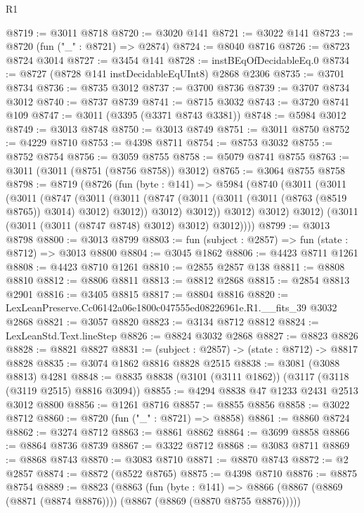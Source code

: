 \begin{lexlean}{R1}
\begin{coremodule}
@8719 := @3011 @8718
@8720 := @3020 @141
@8721 := @3022 @141
@8723 := @8720 (fun ("_" : @8721) => @2874)
@8724 := @8040 @8716
@8726 := @8723 @8724 @3014
@8727 := @3454 @141
@8728 := instBEqOfDecidableEq.{0}
@8734 := @8727 (@8728 @141 instDecidableEqUInt8) @2868 @2306
@8735 := @3701 @8734
@8736 := @8735 @3012
@8737 := @3700 @8736
@8739 := @3707 @8734 @3012
@8740 := @8737 @8739
@8741 := @8715 @3032
@8743 := @3720 @8741 @109
@8747 := @3011 (@3395 (@3371 @8743 @3381))
@8748 := @5984 @3012
@8749 := @3013 @8748
@8750 := @3013 @8749
@8751 := @3011 @8750
@8752 := @4229 @8710
@8753 := @4398 @8711
@8754 := @8753 @3032
@8755 := @8752 @8754
@8756 := @3059 @8755
@8758 := @5079 @8741 @8755
@8763 := @3011 (@3011 (@8751 (@8756 @8758)) @3012)
@8765 := @3064 @8755 @8758
@8798 := @8719
    (@8726
      (fun (byte : @141) =>
      @5984
        (@8740
          (@3011
            (@3011
              (@3011
                (@8747
                  (@3011
                    (@3011
                      (@8747 (@3011 (@3011 (@3011 (@8763 (@8519 @8765)) @3014) @3012) @3012))
                      @3012)
                    @3012))
                @3012)
              @3012)
            @3012)
          (@3011 (@3011 (@3011 (@8747 @8748) @3012) @3012) @3012))))
@8799 := @3013 @8798
@8800 := @3013 @8799
@8803 := fun (subject : @2857) => fun (state : @8712) => @3013 @8800
@8804 := @3045 @1862
@8806 := @4423 @8711 @1261
@8808 := @4423 @8710 @1261
@8810 := @2855 @2857 @138
@8811 := @8808 @8810
@8812 := @8806 @8811
@8813 := @8812 @2868
@8815 := @2854 @8813 @2901
@8816 := @3405 @8815
@8817 := @8804 @8816
@8820 := LexLeanPreserve.Cc06142a06e1800c047555ed08226961e.R1.__fits_39 @3032 @2868
@8821 := @3057 @8820
@8823 := @3134 @8712 @8812
@8824 := LexLeanStd.Text.lineStep
@8826 := @8824 @3032 @2868
@8827 := @8823 @8826
@8828 := @8821 @8827
@8831 := (subject : @2857) -> (state : @8712) -> @8817 @8828
@8835 := @3074 @1862 @8816 @8828 @2515
@8838 := @3081 (@3088 @8813) @4281
@8848 := @8835 @8838 (@3101 (@3111 @1862)) (@3117 (@3118 (@3119 @2515) @8816 @3094))
@8855 := @4294 @8838 @47 @1233 @2431 @2513 @3012 @8800
@8856 := @1261 @8716
@8857 := @8855 @8856
@8858 := @3022 @8712
@8860 := @8720 (fun ("_" : @8721) => @8858)
@8861 := @8860 @8724
@8862 := @3274 @8712
@8863 := @8861 @8862
@8864 := @3699 @8858
@8866 := @8864 @8736 @8739
@8867 := @3322 @8712
@8868 := @3083 @8711
@8869 := @8868 @8743
@8870 := @3083 @8710
@8871 := @8870 @8743
@8872 := @2 @2857
@8874 := @8872 (@8522 @8765)
@8875 := @4398 @8710
@8876 := @8875 @8754
@8889 := @8823
    (@8863
      (fun (byte : @141) =>
      @8866 (@8867 (@8869 (@8871 (@8874 @8876)))) (@8867 (@8869 (@8870 @8755 @8876)))))

\end{coremodule}
\end{lexlean}
